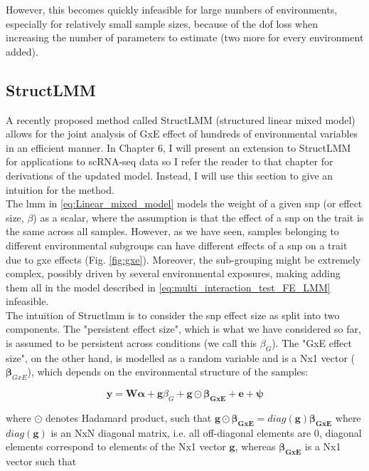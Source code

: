 However, this becomes quickly infeasible for large numbers of environments, especially for relatively small sample sizes, because of the dof loss when increasing the number of parameters to estimate (two more for every environment added).


\subsection{StructLMM}

A recently proposed method called StructLMM (structured linear mixed model) allows for the joint analysis of GxE effect of hundreds of environmental variables \cite{moore2019linear} in an efficient manner.
In Chapter 6, I will present an extension to StructLMM for applications to scRNA-seq data so I refer the reader to that chapter for derivations of the updated model.
Instead, I will use this section to give an intuition for the method.\\

The \gls{lmm} in \eqref{eq:Linear_mixed_model} models the weight of a given \gls{snp} (or effect size, $\beta$) as a scalar, where the assumption is that the effect of a \gls{snp} on the trait is the same across all samples.
However, as we have seen, samples belonging to different environmental subgroups can have different effects of a \gls{snp} on a trait due to \gls{gxe} effects (Fig. \ref{fig:gxe}).
Moreover, the sub-grouping might be extremely complex, possibly driven by several environmental exposures, making adding them all in the model described in \eqref{eq:multi_interaction_test_FE_LMM} infeasible.\\

The intuition of Struct\gls{lmm} is to consider the \gls{snp} effect size as split into two components.
The "persistent effect size", which is what we have considered so far, is assumed to be persistent across conditions (we call this $\beta_G$). 
The "GxE effect size", on the other hand, is modelled as a random variable and is a Nx1 vector ($\boldsymbol{\beta}_{GxE}$), which depends on the environmental structure of the samples:

\begin{equation}\label{eq:StructLMM-int}
 \mathbf{y} =  \mathbf{W}\boldsymbol{\alpha} + \mathbf{g}\beta_G + \mathbf{g} \odot \boldsymbol{\beta_{GxE}} + \mathbf{e} + \boldsymbol{\psi} 
\end{equation}

where $\odot$ denotes Hadamard product, such that $\mathbf{g} \odot \boldsymbol{\beta_{GxE}} = diag(\mathbf{g})\boldsymbol{\beta_{GxE}}$ where $diag(\mathbf{g})$ is an NxN diagonal matrix, i.e. all off-diagonal elements are 0, diagonal elements correspond to elements of the Nx1 vector $\mathbf{g}$, whereas $\boldsymbol{\beta_{GxE}}$ is a Nx1 vector such that


